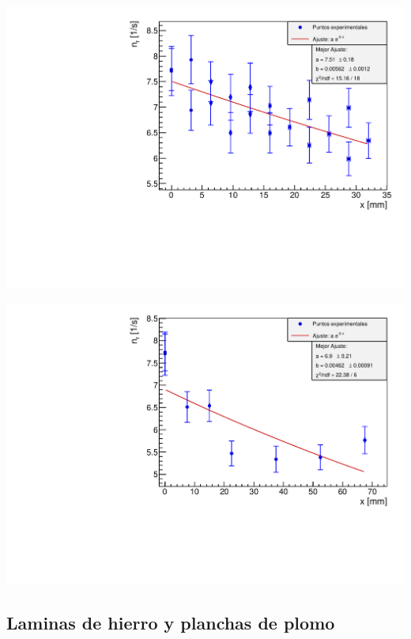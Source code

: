 \documentclass[11pt]{article}
\begin{document}

\begin{minipage}[t]{0.49\linewidth} \centering
	\label{Fig:hierro}
	\includegraphics[width=1\linewidth]{../Graficas/Hierro.pdf}
\end{minipage}
\hfill
\begin{minipage}[t]{0.49\linewidth} \centering
	\label{Fig:plomo}
	\includegraphics[width=1\linewidth]{../Graficas/Plomo2.pdf}
\end{minipage}



\subsection{Laminas de hierro y planchas de plomo}
\end{document}
